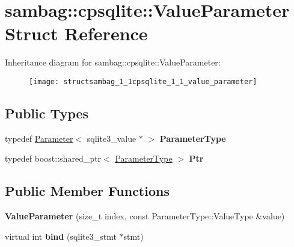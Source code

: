 \hypertarget{structsambag_1_1cpsqlite_1_1_value_parameter}{
\section{sambag::cpsqlite::ValueParameter Struct Reference}
\label{structsambag_1_1cpsqlite_1_1_value_parameter}
}
Inheritance diagram for sambag::cpsqlite::ValueParameter:\begin{figure}[H]
\begin{center}
\leavevmode
\texttt{[image: structsambag\_1\_1cpsqlite\_1\_1\_value\_parameter]}
\end{center}
\end{figure}
\subsection*{Public Types}
\begin{DoxyCompactItemize}
\item 
\hypertarget{structsambag_1_1cpsqlite_1_1_value_parameter_a22145873cc6cf8c9e3d13c3ecdea1bbb}{
typedef \hyperlink{structsambag_1_1cpsqlite_1_1_parameter}{Parameter}$<$ sqlite3\_\-value $\ast$ $>$ {\bfseries ParameterType}}
\label{structsambag_1_1cpsqlite_1_1_value_parameter_a22145873cc6cf8c9e3d13c3ecdea1bbb}

\item 
\hypertarget{structsambag_1_1cpsqlite_1_1_value_parameter_adbdeec663d7879571f2e18cf0e6e9085}{
typedef boost::shared\_\-ptr$<$ \hyperlink{structsambag_1_1cpsqlite_1_1_parameter}{ParameterType} $>$ {\bfseries Ptr}}
\label{structsambag_1_1cpsqlite_1_1_value_parameter_adbdeec663d7879571f2e18cf0e6e9085}

\end{DoxyCompactItemize}
\subsection*{Public Member Functions}
\begin{DoxyCompactItemize}
\item 
\hypertarget{structsambag_1_1cpsqlite_1_1_value_parameter_aa10c7bc0642f33888e2bc76e4ba29bc4}{
{\bfseries ValueParameter} (size\_\-t index, const ParameterType::ValueType \&value)}
\label{structsambag_1_1cpsqlite_1_1_value_parameter_aa10c7bc0642f33888e2bc76e4ba29bc4}

\item 
\hypertarget{structsambag_1_1cpsqlite_1_1_value_parameter_a1dbb7d0bc4a89efe5af85fc7ac7169e0}{
virtual int {\bfseries bind} (sqlite3\_\-stmt $\ast$stmt)}
\label{structsambag_1_1cpsqlite_1_1_value_parameter_a1dbb7d0bc4a89efe5af85fc7ac7169e0}

\end{DoxyCompactItemize}
